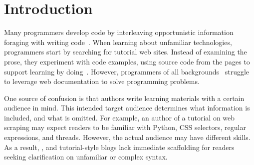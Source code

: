 \section{Introduction}

Many programmers develop code by interleaving opportunistic information foraging with writing code~\cite{brandt_two_2009,brandt_example-centric_2010}.
When learning about unfamiliar technologies, programmers start by searching for tutorial web sites.
Instead of examining the prose, they experiment with code examples, using source code from the pages to support learning by doing~\cite{brandt_two_2009}.
However, programmers of all backgrounds~\cite{duala-ekoko_asking_2012,dorn_lost_2013,dorn_learning_2010} struggle to leverage web documentation to solve programming problems.

One source of confusion is that authors write learning materials with a certain audience in mind.
This intended target audience determines what information is included, and what is omitted.
For example, an author of a tutorial on web scraping may expect readers to be familiar with Python, CSS selectors, regular expressions, and threads.
However, the actual audience may have different skills.
As a result, , and tutorial-style blogs lack immediate scaffolding for readers seeking clarification on unfamiliar or complex syntax.

